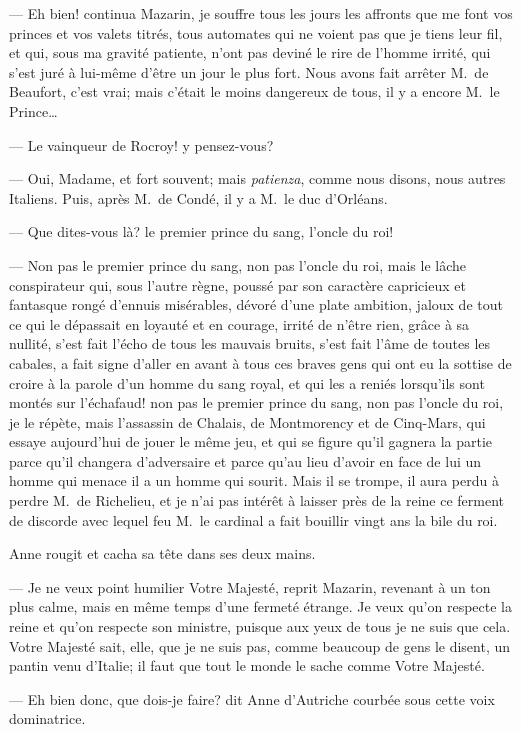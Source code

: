 — Eh bien! continua Mazarin, je souffre tous les jours les affronts que me font vos princes et vos valets titrés, tous automates qui ne voient pas que je tiens leur fil, et qui, sous ma gravité patiente, n'ont pas deviné le rire de l'homme irrité, qui s'est juré à lui-même d'être un jour le plus fort. Nous avons fait arrêter M.~de Beaufort, c'est vrai; mais c'était le moins dangereux de tous, il y a encore M.~le Prince\dots

— Le vainqueur de Rocroy! y pensez-vous?

— Oui, Madame, et fort souvent; mais \textit{patienza}, comme nous disons, nous autres Italiens. Puis, après M.~de Condé, il y a M.~le duc d'Orléans.

— Que dites-vous là? le premier prince du sang, l'oncle du roi!

— Non pas le premier prince du sang, non pas l'oncle du roi, mais le lâche conspirateur qui, sous l'autre règne, poussé par son caractère capricieux et fantasque rongé d'ennuis misérables, dévoré d'une plate ambition, jaloux de tout ce qui le dépassait en loyauté et en courage, irrité de n'être rien, grâce à sa nullité, s'est fait l'écho de tous les mauvais bruits, s'est fait l'âme de toutes les cabales, a fait signe d'aller en avant à tous ces braves gens qui ont eu la sottise de croire à la parole d'un homme du sang royal, et qui les a reniés lorsqu'ils sont montés sur l'échafaud! non pas le premier prince du sang, non pas l'oncle du roi, je le répète, mais l'assassin de Chalais, de Montmorency et de Cinq-Mars, qui essaye aujourd'hui de jouer le même jeu, et qui se figure qu'il gagnera la partie parce qu'il changera d'adversaire et parce qu'au lieu d'avoir en face de lui un homme qui menace il a un homme qui sourit. Mais il se trompe, il aura perdu à perdre M.~de Richelieu, et je n'ai pas intérêt à laisser près de la reine ce ferment de discorde avec lequel feu M.~le cardinal a fait bouillir vingt ans la bile du roi.

Anne rougit et cacha sa tête dans ses deux mains.

— Je ne veux point humilier Votre Majesté, reprit Mazarin, revenant à un ton plus calme, mais en même temps d'une fermeté étrange. Je veux qu'on respecte la reine et qu'on respecte son ministre, puisque aux yeux de tous je ne suis que cela. Votre Majesté sait, elle, que je ne suis pas, comme beaucoup de gens le disent, un pantin venu d'Italie; il faut que tout le monde le sache comme Votre Majesté.

— Eh bien donc, que dois-je faire? dit Anne d'Autriche courbée sous cette voix dominatrice.

